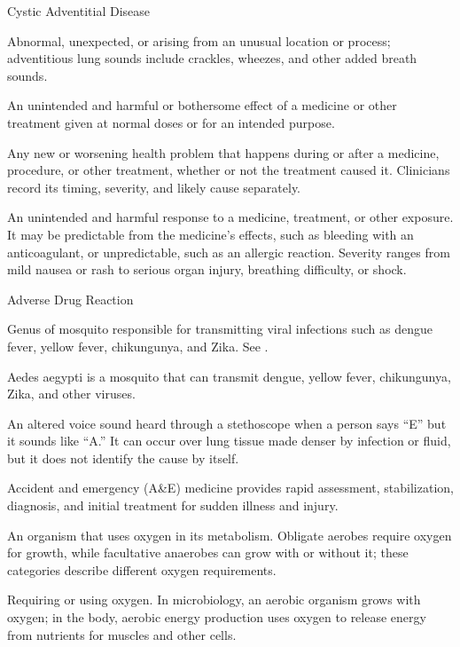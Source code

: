 \synonyms
Cystic Adventitial Disease

 Abnormal, unexpected, or arising from an unusual location or process; adventitious lung sounds include crackles, wheezes, and other added breath sounds.

 An unintended and harmful or bothersome effect of a medicine or other treatment given at normal doses or for an intended purpose.

 Any new or worsening health problem that happens during or after a medicine, procedure, or other treatment, whether or not the treatment caused it. Clinicians record its timing, severity, and likely cause separately.

 An unintended and harmful response to a medicine, treatment, or other exposure. It may be predictable from the medicine's effects, such as bleeding with an anticoagulant, or unpredictable, such as an allergic reaction. Severity ranges from mild nausea or rash to serious organ injury, breathing difficulty, or shock.

\synonyms
Adverse Drug Reaction

 Genus of mosquito responsible for transmitting viral infections such as dengue fever, yellow fever, chikungunya, and Zika. See .

 Aedes aegypti is a mosquito that can transmit dengue, yellow fever, chikungunya, Zika, and other viruses.

 An altered voice sound heard through a stethoscope when a person says “E” but it sounds like “A.” It can occur over lung tissue made denser by infection or fluid, but it does not identify the cause by itself.

 Accident and emergency (A\&E) medicine provides rapid assessment, stabilization, diagnosis, and initial treatment for sudden illness and injury.

 An organism that uses oxygen in its metabolism. Obligate aerobes require oxygen for growth, while facultative anaerobes can grow with or without it; these categories describe different oxygen requirements.

 Requiring or using oxygen. In microbiology, an aerobic organism grows with oxygen; in the body, aerobic energy production uses oxygen to release energy from nutrients for muscles and other cells.

